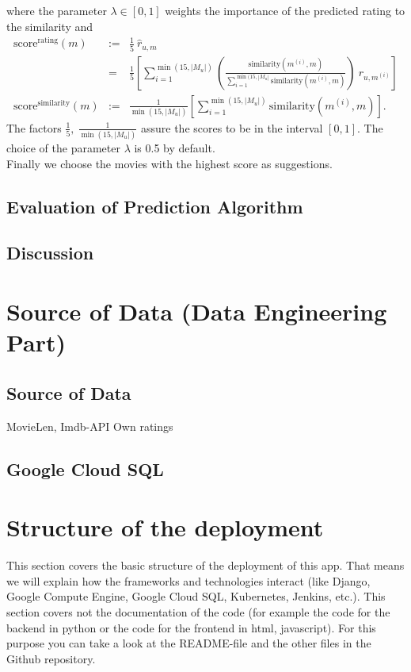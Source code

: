 \documentclass{article}
\begin{document}
where the parameter $\lambda \in [0,1]$ weights the importance of the predicted rating to the similarity and 
\begin{eqnarray}
\text{score}^{\text{rating}}(m) &:=& \frac{1}{5}~ \hat{r}_{u,m}\nonumber\\
 &=& \frac{1}{5} \left[ \sum_{i=1}^{\min(15, |M_u|)} \left(\frac{\text{similarity}(m^{(i)}, m)}{\sum_{i=1}^{\min(15, |M_u|} \text{similarity}(m^{(i)}, m)} \right)~r_{u, m^{(i)}}\right]\nonumber\\
\text{score}^{\text{similarity}}(m) &:= & \frac{1}{\min(15, |M_u|)}\left[\sum_{i=1}^{\min(15, |M_u|)} \text{similarity}(m^{(i)}, m)\right].\nonumber
\end{eqnarray}
The factors $\frac{1}{5}, ~\frac{1}{\min(15, |M_u|)}$ assure the scores to be in the interval $[0,1]$. The choice of the parameter $\lambda$ is 0.5 by default.\\
Finally we choose the movies with the highest score as suggestions.


\subsection{Evaluation of Prediction Algorithm}


\subsection{Discussion}


\section{Source of Data (Data Engineering Part)}

\subsection{Source of Data}

MovieLen, Imdb-API
Own ratings


\subsection{Google Cloud SQL}




\section{Structure of the deployment}

This section covers the basic structure of the deployment of this app. That means we will explain how the frameworks and technologies interact (like Django, Google Compute Engine, Google Cloud SQL, Kubernetes, Jenkins, etc.). This section covers not the documentation of the code (for example the code for the backend in python or the code for the frontend in html, javascript). For this purpose you can take a look at the README-file and the other files in the Github repository.
\end{document}

